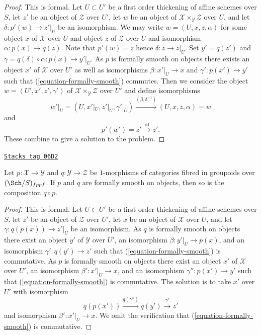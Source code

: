\begin{proof}
This is formal. Let $U \subset U'$ be a first order thickening
of affine schemes over $S$, let $z'$ be an object of $\mathcal{Z}$
over $U'$, let $w$ be an object of
$\mathcal{X} \times_\mathcal{Y} \mathcal{Z}$ over $U$, and let
$\delta : p'(w) \to z'|_U$ be an isomorphism.
We may write
$w = (U, x, z, \alpha)$ for some object $x$ of $\mathcal{X}$ over $U$
and object $z$ of $\mathcal{Z}$ over $U$ and isomorphism
$\alpha : p(x) \to q(z)$. Note that $p'(w) = z$ hence
$\delta : z \to z|_U$. Set $y' = q(z')$ and
$\gamma = q(\delta) \circ \alpha : p(x) \to y'|_U$.
As $p$ is formally smooth on objects there exists an
object $x'$ of $\mathcal{X}$ over $U'$ as well as
isomorphisms $\beta : x'|_U \to x$ and $\gamma' : p(x') \to y'$ such that
(\ref{equation-formally-smooth}) commutes. Then we consider the object
$w = (U', x', z', \gamma')$ of $\mathcal{X} \times_\mathcal{Y} \mathcal{Z}$
over $U'$ and define isomorphisms
$$
w'|_U = (U, x'|_U, z'|_U, \gamma'|_U)
\xrightarrow{(\beta, \delta^{-1})}
(U, x, z, \alpha) = w
$$
and
$$
p'(w') = z' \xrightarrow{\text{id}} z'.
$$
These combine to give a solution to the problem.
\end{proof}

\begin{lemma}
\label{criteria-lemma-composition-formally-smooth}
\href{https://stacks.math.columbia.edu/tag/06D2}{\texttt{Stacks tag 06D2}}

Let $p : \mathcal{X} \to \mathcal{Y}$ and $q : \mathcal{Y} \to \mathcal{Z}$
be $1$-morphisms of categories fibred in groupoids over $(\Sch/S)_{fppf}$.
If $p$ and $q$ are formally smooth on objects, then so is the composition
$q \circ p$.
\end{lemma}

\begin{proof}
This is formal. Let $U \subset U'$ be a first order thickening
of affine schemes over $S$, let $z'$ be an object of $\mathcal{Z}$
over $U'$, let $x$ be an object of $\mathcal{X}$ over $U$,
and let $\gamma : q(p(x)) \to z'|_U$ be an isomorphism. As $q$ is
formally smooth on objects there exist an object
$y'$ of $\mathcal{Y}$ over $U'$, an isomorphism
$\beta : y'|_U \to p(x)$, and an isomorphism $\gamma' : q(y') \to z'$
such that (\ref{equation-formally-smooth}) is commutative. As $p$ is
formally smooth on objects there exist an object
$x'$ of $\mathcal{X}$ over $U'$, an isomorphism
$\beta' : x'|_U \to x$, and an isomorphism $\gamma'' : p(x') \to y'$
such that (\ref{equation-formally-smooth}) is commutative.
The solution is to take $x'$ over $U'$ with isomorphism
$$
q(p(x')) \xrightarrow{q(\gamma'')} q(y') \xrightarrow{\gamma'} z'
$$
and isomorphism $\beta' : x'|_U \to x$. We omit the verification
that (\ref{equation-formally-smooth}) is commutative.
\end{proof}

